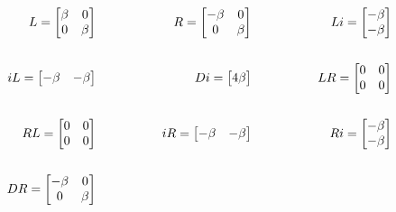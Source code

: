 \documentclass[12pt,a4paper]{article}
\begin{document}
\begin{sol}
\begin{minipage}{18.5cm}
			\[\begin{aligned}
				L = \begin{bmatrix}
					\beta & 0 \\
					0 & \beta
				\end{bmatrix} & \hspace{1cm} & R = \begin{bmatrix}
					-\beta & 0 \\
					0 & \beta
				\end{bmatrix} & \hspace{1cm} & Li = \begin{bmatrix}
					-\beta \\ - \beta
				\end{bmatrix} \\\\
				iL = \begin{bmatrix}
					-\beta & - \beta
				\end{bmatrix} & \hspace{1.5cm} & Di = \begin{bmatrix}
					4\beta
				\end{bmatrix} & \hspace{1.5cm} & LR = \begin{bmatrix}
					0 & 0 \\
					0 & 0
				\end{bmatrix} \\\\
				RL = \begin{bmatrix}
					0 & 0 \\
					0 & 0
				\end{bmatrix} & \hspace{1.5cm} & iR = \begin{bmatrix}
					-\beta & - \beta
				\end{bmatrix} & \hspace{1.5cm} & Ri = \begin{bmatrix}
					-\beta \\ - \beta
				\end{bmatrix} \\\\
				DR = \begin{bmatrix}
					-\beta & 0 \\ 0 & \beta
				\end{bmatrix}
			\end{aligned}\]
			
			\vspace{.5cm}
			

\end{minipage}
\end{sol}
\end{document}

